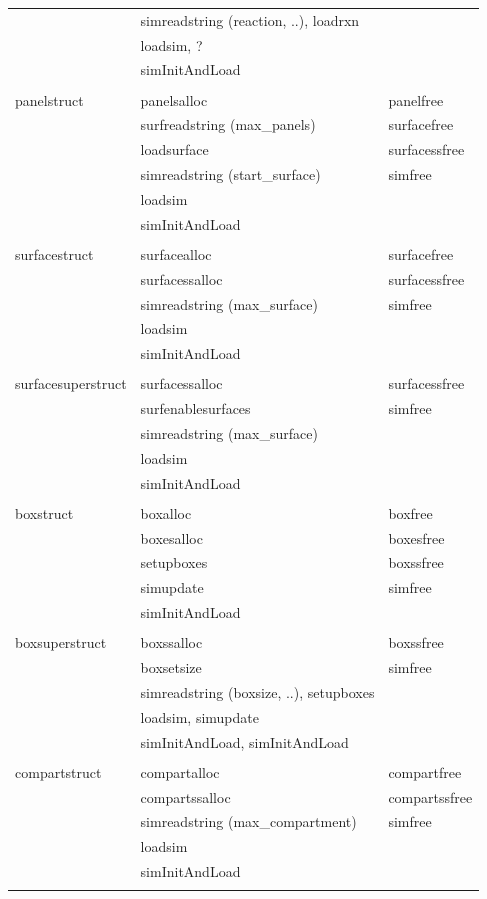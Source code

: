 \documentclass {scrbook}
\begin{document}
\begin{ttfamily}
\begin{longtable}[c]{lll}
&simreadstring (reaction, ..), loadrxn\\
&loadsim, ?\\
&simInitAndLoad\\
\\
panelstruct&panelsalloc&panelfree\\
&surfreadstring (max\_panels)&surfacefree\\
&loadsurface&surfacessfree\\
&simreadstring (start\_surface)&simfree\\
&loadsim\\
&simInitAndLoad&\\
\\
surfacestruct&surfacealloc&surfacefree\\
&surfacessalloc&surfacessfree\\
&simreadstring (max\_surface)&simfree\\
&loadsim\\
&simInitAndLoad\\
\\
surfacesuperstruct&surfacessalloc&surfacessfree\\
&surfenablesurfaces&simfree\\
&simreadstring (max\_surface)\\
&loadsim\\
&simInitAndLoad\\
\\
boxstruct&boxalloc&boxfree\\
&boxesalloc&boxesfree\\
&setupboxes&boxssfree\\
&simupdate&simfree\\
&simInitAndLoad\\
\\
boxsuperstruct&boxssalloc&boxssfree\\
&boxsetsize&simfree\\
&simreadstring (boxsize, ..), setupboxes\\
&loadsim, simupdate\\
&simInitAndLoad, simInitAndLoad\\
\\
compartstruct&compartalloc&compartfree\\
&compartssalloc&compartssfree\\
&simreadstring (max\_compartment)&simfree\\
&loadsim\\
&simInitAndLoad\\
\\

\end{longtable}
\end{ttfamily}
\end{document}
